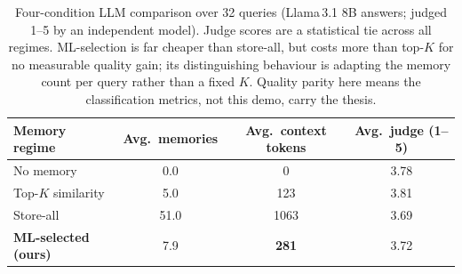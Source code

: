 \begin{table}[t]
\centering\small
\caption{Four-condition LLM comparison over 32 queries (Llama\,3.1 8B answers; judged 1--5 by an independent model). Judge
scores are a statistical tie across all regimes. ML-selection is far cheaper than
store-all, but costs more than top-$K$ for no measurable quality gain; its
distinguishing behaviour is adapting the memory count per query rather than a fixed
$K$. Quality parity here means the classification metrics, not this demo, carry the
thesis.}
\label{tab:llm}
\begin{tabular}{lccc}
\toprule
Memory regime & Avg.\ memories & Avg.\ context tokens & Avg.\ judge (1--5) \\
\midrule
No memory & 0.0 & 0 & 3.78 \\
Top-$K$ similarity & 5.0 & 123 & 3.81 \\
Store-all & 51.0 & 1063 & 3.69 \\
\textbf{ML-selected (ours)} & 7.9 & \textbf{281} & 3.72 \\
\bottomrule
\end{tabular}
\end{table}
